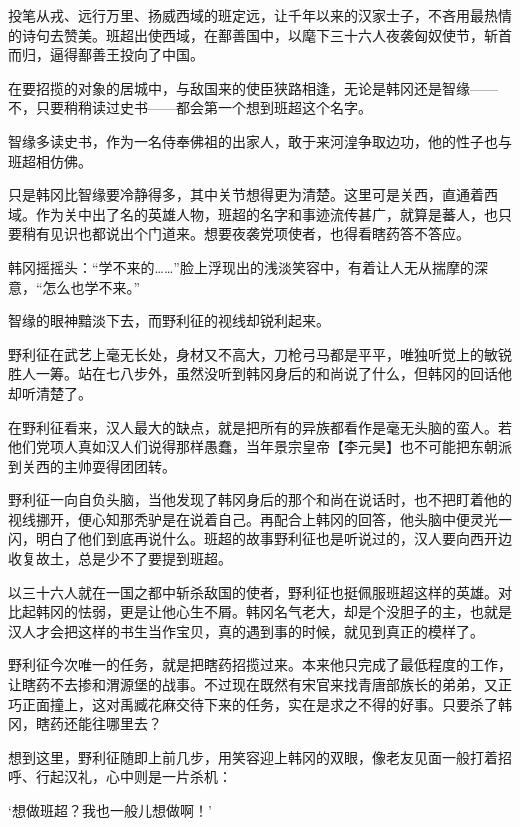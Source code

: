 投笔从戎、远行万里、扬威西域的班定远，让千年以来的汉家士子，不吝用最热情的诗句去赞美。班超出使西域，在鄯善国中，以麾下三十六人夜袭匈奴使节，斩首而归，逼得鄯善王投向了中国。

在要招揽的对象的居城中，与敌国来的使臣狭路相逢，无论是韩冈还是智缘——不，只要稍稍读过史书——都会第一个想到班超这个名字。

智缘多读史书，作为一名侍奉佛祖的出家人，敢于来河湟争取边功，他的性子也与班超相仿佛。

只是韩冈比智缘要冷静得多，其中关节想得更为清楚。这里可是关西，直通着西域。作为关中出了名的英雄人物，班超的名字和事迹流传甚广，就算是蕃人，也只要稍有见识也都说出个门道来。想要夜袭党项使者，也得看瞎药答不答应。

韩冈摇摇头：“学不来的……”脸上浮现出的浅淡笑容中，有着让人无从揣摩的深意，“怎么也学不来。”

智缘的眼神黯淡下去，而野利征的视线却锐利起来。

野利征在武艺上毫无长处，身材又不高大，刀枪弓马都是平平，唯独听觉上的敏锐胜人一筹。站在七八步外，虽然没听到韩冈身后的和尚说了什么，但韩冈的回话他却听清楚了。

在野利征看来，汉人最大的缺点，就是把所有的异族都看作是毫无头脑的蛮人。若他们党项人真如汉人们说得那样愚蠢，当年景宗皇帝【李元昊】也不可能把东朝派到关西的主帅耍得团团转。

野利征一向自负头脑，当他发现了韩冈身后的那个和尚在说话时，也不把盯着他的视线挪开，便心知那秃驴是在说着自己。再配合上韩冈的回答，他头脑中便灵光一闪，明白了他们到底再说什么。班超的故事野利征也是听说过的，汉人要向西开边收复故土，总是少不了要提到班超。

以三十六人就在一国之都中斩杀敌国的使者，野利征也挺佩服班超这样的英雄。对比起韩冈的怯弱，更是让他心生不屑。韩冈名气老大，却是个没胆子的主，也就是汉人才会把这样的书生当作宝贝，真的遇到事的时候，就见到真正的模样了。

野利征今次唯一的任务，就是把瞎药招揽过来。本来他只完成了最低程度的工作，让瞎药不去掺和渭源堡的战事。不过现在既然有宋官来找青唐部族长的弟弟，又正巧正面撞上，这对禹臧花麻交待下来的任务，实在是求之不得的好事。只要杀了韩冈，瞎药还能往哪里去？

想到这里，野利征随即上前几步，用笑容迎上韩冈的双眼，像老友见面一般打着招呼、行起汉礼，心中则是一片杀机：

‘想做班超？我也一般儿想做啊！’

